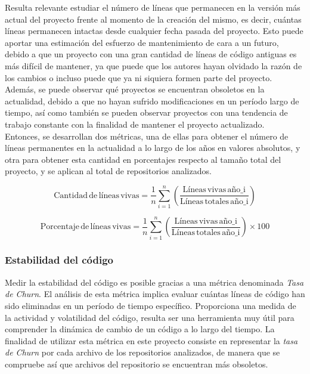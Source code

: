 \documentclass[a4paper, 12pt]{book}
\begin{document}
Resulta relevante estudiar el número de líneas que permanecen en la versión más actual del proyecto frente al momento de la creación del mismo, es decir, cuántas líneas permanecen intactas desde cualquier fecha pasada del proyecto. 
Esto puede aportar una estimación del esfuerzo de mantenimiento de cara a un futuro, debido a que un proyecto con una gran cantidad de líneas de código antiguas es más difícil de mantener, ya que puede que los autores 
hayan olvidado la razón de los cambios o incluso puede que ya ni siquiera formen parte del proyecto. Además, se puede observar qué proyectos se encuentran obsoletos en la actualidad, debido a que no hayan sufrido
modificaciones en un período largo de tiempo, así como también se pueden observar proyectos con una tendencia de trabajo constante con la finalidad de mantener el proyecto actualizado.
\\Entonces, se desarrollan dos métricas, una de ellas para obtener el número de líneas permanentes en la actualidad a lo largo de los años en valores absolutos, y otra para obtener esta cantidad en porcentajes respecto al tamaño total
del proyecto, y se aplican al total de repositorios analizados.

\[\text{Cantidad} \, \text{de} \, \text{líneas} \, \text{vivas} = \frac{1}{n} \sum_{i=1}^{n} \left( \frac{\text{Líneas} \, \text{vivas} \, \text{año_i}}{\text{Líneas} \, \text{totales} \, \text{año_i}} \right)\]

\[\text{Porcentaje} \, \text{de} \, \text{líneas} \, \text{vivas} = \frac{1}{n} \sum_{i=1}^{n} \left( \frac{\text{Líneas} \, \text{vivas} \, \text{año_i}}{\text{Líneas} \, \text{totales} \, \text{año_i}} \right) \times 100 \]


\subsubsection{Estabilidad del código}
\label{subsubsec:estabilidad-codigo}

Medir la estabilidad del código es posible gracias a una métrica denominada \textit{Tasa de Churn}. El análisis de esta métrica implica evaluar cuántas líneas de código han sido eliminadas en un período de tiempo específico.
Proporciona una medida de la actividad y volatilidad del código, resulta ser una herramienta muy útil para comprender la dinámica de cambio de un código a lo largo del tiempo. La finalidad de utilizar esta métrica en este proyecto
consiste en representar la \textit{tasa de Churn} por cada archivo de los repositorios analizados, de manera que se compruebe así que archivos del repositorio se encuentran más obsoletos.
\end{document}
